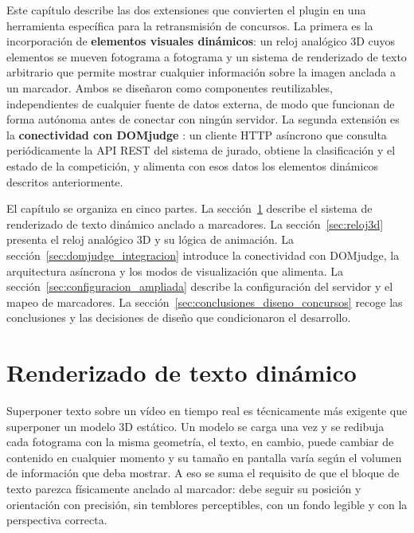 Este capítulo describe las dos extensiones que convierten el plugin en una herramienta específica
para la retransmisión de concursos. La primera es la incorporación de \textbf{elementos visuales
dinámicos}: un reloj analógico 3D cuyos elementos se mueven fotograma a fotograma y un sistema
de renderizado de texto arbitrario que permite mostrar cualquier información sobre la imagen
anclada a un marcador. Ambos se diseñaron como componentes reutilizables, independientes de
cualquier fuente de datos externa, de modo que funcionan de forma autónoma antes de conectar con
ningún servidor. La segunda extensión es la \textbf{conectividad con DOMjudge}
\citep{DOMjudge}: un cliente HTTP asíncrono que consulta periódicamente la API REST del sistema
de jurado, obtiene la clasificación y el estado de la competición, y alimenta con esos datos los
elementos dinámicos descritos anteriormente.
 
El capítulo se organiza en cinco partes. La sección~\ref{sec:texto_dinamico} describe el sistema
de renderizado de texto dinámico anclado a marcadores. La sección~\ref{sec:reloj3d} presenta el
reloj analógico 3D y su lógica de animación. La sección~\ref{sec:domjudge_integracion} introduce
la conectividad con DOMjudge, la arquitectura asíncrona y los modos de visualización que
alimenta. La sección~\ref{sec:configuracion_ampliada} describe la configuración del servidor y
el mapeo de marcadores. La sección~\ref{sec:conclusiones_diseno_concursos} recoge las conclusiones y
las decisiones de diseño que condicionaron el desarrollo.
 
 
\section{Renderizado de texto dinámico}
\label{sec:texto_dinamico}
 
Superponer texto sobre un vídeo en tiempo real es técnicamente más exigente que superponer un
modelo 3D estático. Un modelo se carga una vez y se redibuja cada fotograma con la misma geometría,
el texto, en cambio, puede cambiar de contenido en cualquier momento y su tamaño en pantalla
varía según el volumen de información que deba mostrar. A eso se suma el requisito de que el
bloque de texto parezca físicamente anclado al marcador: debe seguir su posición y orientación
con precisión, sin temblores perceptibles, con un fondo legible y con la perspectiva correcta.
 
